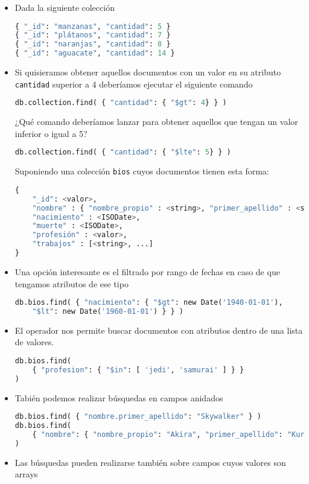 \begin{itemize}
	\item Dada la siguiente colección
\begin{lstlisting}[language=python]
{ "_id": "manzanas", "cantidad": 5 }
{ "_id": "plátanos", "cantidad": 7 }
{ "_id": "naranjas", "cantidad": 8 }
{ "_id": "aguacate", "cantidad": 14 }
\end{lstlisting}
\item Si quisieramos obtener aquellos documentos con un valor en su atributo \texttt{cantidad} superior a 4 deberíamos ejecutar el siguiente comando
\begin{lstlisting}[language=python]
db.collection.find( { "cantidad": { "$gt": 4} } )
\end{lstlisting}
¿Qué comando deberíamos lanzar para obtener aquellos que tengan un valor inferior o igual a 5?
\begin{lstlisting}[language=python]
db.collection.find( { "cantidad": { "$lte": 5} } )
\end{lstlisting}
Suponiendo una colección \texttt{bios} cuyos documentos tienen esta forma:
\begin{lstlisting}[language=python]
{
	"_id": <valor>,
	"nombre" : { "nombre_propio" : <string>, "primer_apellido" : <string>},
	"nacimiento" : <ISODate>,
	"muerte" : <ISODate>,
	"profesión" : <valor>,
	"trabajos" : [<string>, ...] 
}
\end{lstlisting}
\item Una opción interesante es el filtrado por rango de fechas en caso de que tengamos atributos de ese tipo
\begin{lstlisting}[language=python]
db.bios.find( { "nacimiento": { "$gt": new Date('1940-01-01'), 
	"$lt": new Date('1960-01-01') } } )
\end{lstlisting}
\item El operador  nos permite buscar documentos con atributos dentro de una lista de valores.
\begin{lstlisting}[language=python]
db.bios.find(
	{ "profesion": { "$in": [ 'jedi', 'samurai' ] } }
)
\end{lstlisting}
\item Tabién podemos realizar búsquedas en campos anidados
\begin{lstlisting}[language=python]
db.bios.find( { "nombre.primer_apellido": "Skywalker" } )
db.bios.find(
	{ "nombre": { "nombre_propio": "Akira", "primer_apellido": "Kurosawa" } }
)
\end{lstlisting}
\item Las búsquedas pueden realizarse también sobre campos cuyos valores son arrays

\end{itemize}
